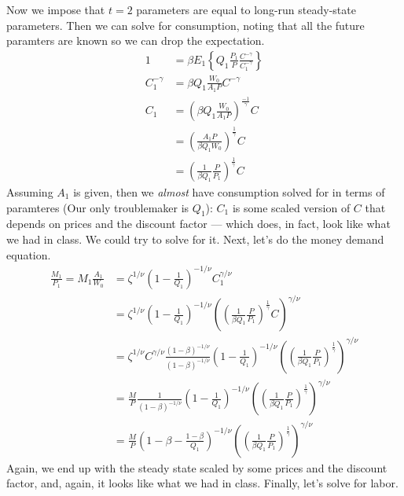 \documentclass[answers]{exam}
\newcommand{\1}{\mathbf{1}}
\begin{document}
\begin{enumerate}[(a)]
\begin{solution}
        Now we impose that $t=2$ parameters are equal to long-run steady-state parameters. Then we can solve for consumption, noting that all the future paramters are known so we can drop the expectation.
        \begin{align*}
            1&=\beta E_1\left\{Q_1 \frac{P_1}{P} \frac{C^{-\gamma}}{C_{1}^{-\gamma}}\right\} \\
            C_{1}^{-\gamma}&=\beta Q_1 \frac{W_0}{A_1 P} C^{-\gamma} \\
            C_1&=\left(\beta Q_1 \frac{W_0}{A_1 P}\right)^{\frac{-1}{\gamma}} C \\
            &=\left(\frac{A_1 P}{\beta Q_1 W_0}\right)^{\frac{1}{\gamma}} C\\
            &=\left(\frac{1}{\beta Q_1} \frac{P}{P_1}\right)^{\frac{1}{\gamma}} C
        \end{align*}
        Assuming $A_1$ is given, then we \textit{almost} have consumption solved for in terms of paramteres (Our only troublemaker is $Q_1$): $C_1$ is some scaled version of $C$ that depends on prices and the discount factor --- which does, in fact, look like what we had in class. We could try to solve for it. Next, let's do the money demand equation.
        \begin{align*}
            \frac{M_1}{P_1} = M_1\frac{A_1}{W_0} & = \zeta^{1/\nu}\left(1-\frac{1}{Q_1}\right)^{-1/\nu}C_{1}^{\gamma/\nu} \\
            & =\zeta^{1/\nu}\left(1-\frac{1}{Q_1}\right)^{-1/\nu} \left(\left(\frac{1}{\beta Q_1} \frac{P}{P_1}\right)^{\frac{1}{\gamma}} C\right)^{\gamma/\nu} \\
            & =\zeta^{1/\nu} C^{\gamma/\nu} \frac{\left(1-\beta\right)^{-1/\nu}}{\left(1-\beta\right)^{-1/\nu}} \left(1-\frac{1}{Q_1}\right)^{-1/\nu} \left(\left(\frac{1}{\beta Q_1} \frac{P}{P_1}\right)^{\frac{1}{\gamma}}\right)^{\gamma/\nu} \\
            & =\frac{M}{P} \frac{1}{\left(1-\beta\right)^{-1/\nu}} \left(1-\frac{1}{Q_1}\right)^{-1/\nu} \left(\left(\frac{1}{\beta Q_1} \frac{P}{P_1}\right)^{\frac{1}{\gamma}}\right)^{\gamma/\nu} \\
            & = \frac{M}{P} \left(1-\beta-\frac{1-\beta}{Q_1}\right)^{-1/\nu} \left(\left(\frac{1}{\beta Q_1} \frac{P}{P_1}\right)^{\frac{1}{\gamma}}\right)^{\gamma/\nu}
        \end{align*}
        Again, we end up with the steady state scaled by some prices and the discount factor, and, again, it looks like what we had in class. Finally, let's solve for labor.

\end{solution}
\end{enumerate}
\end{document}

